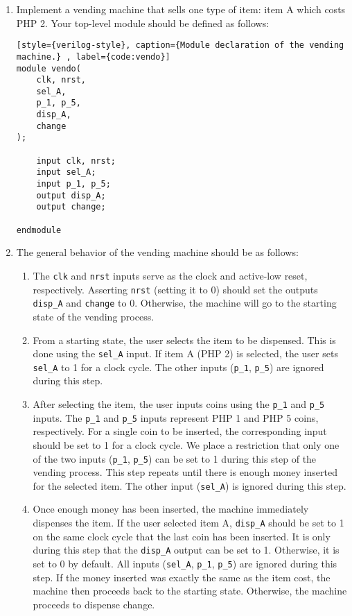 		\begin{enumerate}
			\item Implement a vending machine that sells one type of item: item A which costs PHP 2. Your top-level module should be defined as follows:
			
\begin{lstlisting}[style={verilog-style}, caption={Module declaration of the vending machine.} , label={code:vendo}]
module vendo(
	clk, nrst,
	sel_A,
	p_1, p_5,
	disp_A,
	change
);

	input clk, nrst;
	input sel_A;
	input p_1, p_5;
	output disp_A;
	output change;

endmodule
\end{lstlisting} 

			\item The general behavior of the vending machine should be as follows:
				\begin{enumerate}
					\item The \texttt{clk} and \texttt{nrst} inputs serve as the clock and active-low reset, respectively. Asserting \texttt{nrst} (setting it to 0) should set the outputs \texttt{disp\_A} and \texttt{change} to 0. Otherwise, the machine will go to the starting state of the vending process.
					
					\item From a starting state, the user selects the item to be dispensed. This is done using the \texttt{sel\_A} input. If item A (PHP 2) is selected, the user sets \texttt{sel\_A} to 1 for a clock cycle. The other inputs (\texttt{p\_1}, \texttt{p\_5}) are ignored during this step.
					
					\item After selecting the item, the user inputs coins using the \texttt{p\_1} and \texttt{p\_5} inputs. The \texttt{p\_1} and \texttt{p\_5} inputs represent PHP 1 and PHP 5 coins, respectively. For a single coin to be inserted, the corresponding input should be set to 1 for a clock cycle. We place a restriction that only one of the two inputs (\texttt{p\_1}, \texttt{p\_5}) can be set to 1 during this step of the vending process. This step repeats until there is enough money inserted for the selected item. The other input (\texttt{sel\_A}) is ignored during this step.
					
					\item Once enough money has been inserted, the machine immediately dispenses the item. If the user selected item A, \texttt{disp\_A} should be set to 1 on the same clock cycle that the last coin has been inserted. It is only during this step that the \texttt{disp\_A} output can be set to 1. Otherwise, it is set to 0 by default. All inputs (\texttt{sel\_A}, \texttt{p\_1}, \texttt{p\_5}) are ignored during this step. If the money inserted was exactly the same as the item cost, the machine then proceeds back to the starting state. Otherwise, the machine proceeds to dispense change.
					

\end{enumerate}
\end{enumerate}
